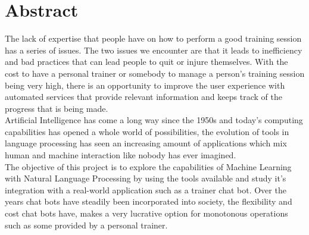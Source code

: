 \chapter*{Abstract}

The lack of expertise that people have on how to perform a good training session has a series of issues. The two issues we encounter are that it leads to inefficiency and bad practices that can lead people to quit or injure themselves. With the cost to have a personal trainer or somebody to manage a person’s training session being very high, there is an opportunity to improve the user experience with automated services that provide relevant information and keeps track of the progress that is being made.\\

Artificial Intelligence has come a long way since the 1950s and today’s computing capabilities has opened a whole world of possibilities, the evolution of tools in language processing has seen an increasing amount of applications which mix human and machine interaction like nobody has ever imagined.\\

The objective of this project is to explore the capabilities of Machine Learning with Natural Language Processing by using the tools available and study it’s integration with a real-world application such as a trainer chat bot. Over the years chat bots have steadily been incorporated into society, the flexibility and cost chat bots have, makes a very lucrative option for monotonous operations such as some provided by a personal trainer.







